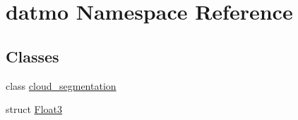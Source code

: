 \hypertarget{namespacedatmo}{}\section{datmo Namespace Reference}
\label{namespacedatmo}
\subsection*{Classes}
\begin{DoxyCompactItemize}
\item 
class \hyperlink{classdatmo_1_1cloud__segmentation}{cloud\+\_\+segmentation}
\item 
struct \hyperlink{structdatmo_1_1Float3}{Float3}
\end{DoxyCompactItemize}
